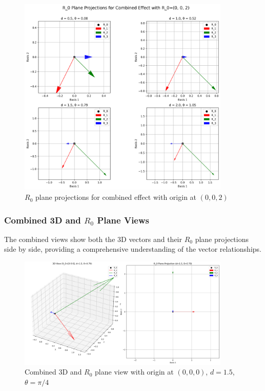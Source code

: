 \begin{figure}[H]
    \centering
    \includegraphics[width=0.9\textwidth]{figures/r0_projections_combined_effect_R0_0_0_2.png}
    \caption{$R_0$ plane projections for combined effect with origin at $(0,0,2)$}
    \label{fig:example_r0_projections_custom2}
\end{figure}

\subsubsection{Combined 3D and $R_0$ Plane Views}

The combined views show both the 3D vectors and their $R_0$ plane projections side by side, providing a comprehensive understanding of the vector relationships.

\begin{figure}[H]
    \centering
    \includegraphics[width=0.9\textwidth]{figures/combined_view_R0_0_0_0_d_1p5_theta_0p79.png}
    \caption{Combined 3D and $R_0$ plane view with origin at $(0,0,0)$, $d=1.5$, $\theta=\pi/4$}
    \label{fig:example_combined_view_default}
\end{figure}

